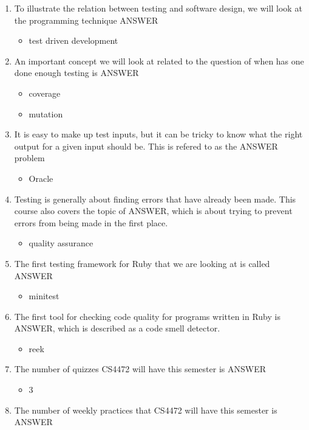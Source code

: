 \documentclass{exam}
\begin{document}
\begin{enumerate}
\item To illustrate the relation between testing and software design, we will look at the programming technique ANSWER
\begin{itemize}
\item test driven development
\end{itemize}
\item An important concept we will look at related to the question of when has one done enough testing is ANSWER
\begin{itemize}
\item coverage
\item mutation
\end{itemize}
\item It is easy to make up test inputs, but it can be tricky to know what the right output for a given input should be.  This is refered to as the ANSWER problem
\begin{itemize}
\item Oracle
\end{itemize}
\item Testing is generally about finding errors that have already been made.  This course also covers the topic of ANSWER, which is about trying to prevent errors from being made in the first place.
\begin{itemize}
\item quality assurance
\end{itemize}
\item The first testing framework for Ruby that we are looking at is called ANSWER
\begin{itemize}
\item minitest
\end{itemize}
\item The first tool for checking code quality for programs written in Ruby is ANSWER, which is described as a code smell detector.
\begin{itemize}
\item reek
\end{itemize}
\item The number of quizzes CS4472 will have this semester is ANSWER
\begin{itemize}
\item 3
\end{itemize}
\item The number of weekly practices that CS4472 will have this semester is ANSWER
\begin{itemize}

\end{itemize}
\end{enumerate}
\end{document}
